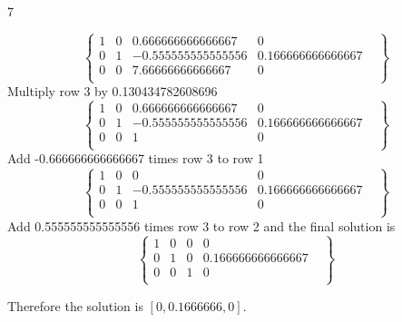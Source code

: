 \documentclass{exercises}
\begin{document}
\begin{exr}{}{7}
\begin{enumerate}
\begin{equation}
\left\{
    \begin{array}{ccc|cl}1&0&0.666666666666667&0&\\0&1&-0.555555555555556&0.166666666666667&\\0&0&7.66666666666667&0&\\\end{array}
\right\}
\end{equation}Multiply row 3 by 0.130434782608696
\begin{equation}
\left\{
    \begin{array}{ccc|cl}1&0&0.666666666666667&0&\\0&1&-0.555555555555556&0.166666666666667&\\0&0&1&0&\\\end{array}
\right\}
\end{equation}Add -0.666666666666667 times row 3 to row 1
\begin{equation}
\left\{
    \begin{array}{ccc|cl}1&0&0&0&\\0&1&-0.555555555555556&0.166666666666667&\\0&0&1&0&\\\end{array}
\right\}
\end{equation}Add 0.555555555555556 times row 3 to row 2
and the final solution is
\begin{equation}
\left\{
    \begin{array}{ccc|cl}1&0&0&0&\\0&1&0&0.166666666666667&\\0&0&1&0&\\\end{array}
\right\}
\end{equation}

Therefore the solution is $[0, 0.1666666, 0].$ \\[2in]
	\end{enumerate}
\end{exr}
\end{document}
